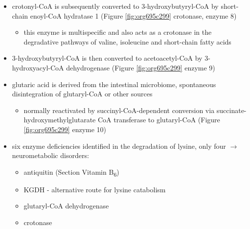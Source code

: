 \documentclass[12pt]{scrartcl}
\begin{document}
\begin{center}
\begin{center}
\begin{itemize}
\begin{itemize}
\begin{itemize}
\end{itemize}
\end{itemize}
\item crotonyl-CoA is subsequently converted to 3-hydroxybutyryl-CoA by
short-chain enoyl-CoA hydratase 1 (Figure \ref{fig:org695c299} crotonase, enzyme 8)
\begin{itemize}
\item this enzyme is multispecific and also acts as a crotonase in the
degradative pathways of valine, isoleucine and short-chain fatty
acids
\end{itemize}
\item 3-hydroxybutyryl-CoA is then converted to acetoacetyl-CoA by
3-hydroxyacyl-CoA dehydrogenase (Figure \ref{fig:org695c299} enzyme 9)
\item glutaric acid is derived from the intestinal microbiome, spontaneous
disintegration of glutaryl-CoA or other sources
\begin{itemize}
\item normally reactivated by succinyl-CoA-dependent conversion via
succinate-hydroxymethylglutarate CoA transferase to glutaryl-CoA
(Figure \ref{fig:org695c299} enzyme 10)
\end{itemize}

\item six enzyme deficiencies identified in the degradation of lysine,
only four \(\to\) neurometabolic disorders:
\begin{itemize}
\item antiquitin (Section Vitamin B\textsubscript{6})
\item KGDH - alternative route for lysine catabolism
\item glutaryl-CoA dehydrogenase
\item crotonase
\end{itemize}
\end{itemize}


\end{center}
\end{center}
\end{document}

